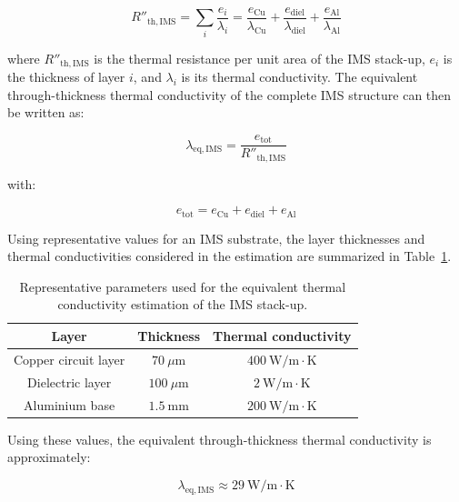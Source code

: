 \begin{equation}
R''_{\mathrm{th,IMS}} =
\sum_i \frac{e_i}{\lambda_i}
=
\frac{e_{\mathrm{Cu}}}{\lambda_{\mathrm{Cu}}}
+
\frac{e_{\mathrm{diel}}}{\lambda_{\mathrm{diel}}}
+
\frac{e_{\mathrm{Al}}}{\lambda_{\mathrm{Al}}}
\end{equation}

where \(R''_{\mathrm{th,IMS}}\) is the thermal resistance per unit area of the IMS stack-up, \(e_i\) is the thickness of layer \(i\), and \(\lambda_i\) is its thermal conductivity. The equivalent through-thickness thermal conductivity of the complete IMS structure can then be written as:

\begin{equation}
\lambda_{\mathrm{eq,IMS}} =
\frac{e_{\mathrm{tot}}}{R''_{\mathrm{th,IMS}}}
\end{equation}

with:

\begin{equation}
e_{\mathrm{tot}} =
e_{\mathrm{Cu}} + e_{\mathrm{diel}} + e_{\mathrm{Al}}
\end{equation}

Using representative values for an IMS substrate, the layer thicknesses and thermal conductivities considered in the estimation are summarized in Table~\ref{tab:ims_stackup_values}.

\begin{table}[H]
    \centering
    \caption{Representative parameters used for the equivalent thermal conductivity estimation of the IMS stack-up.}
    \label{tab:ims_stackup_values}
    \begin{tabular}{|c|c|c|}
        \hline
        \textbf{Layer} & \textbf{Thickness} & \textbf{Thermal conductivity} \\
        \hline
        Copper circuit layer & \(70~\mu\mathrm{m}\) & \(400~\mathrm{W/m\cdot K}\) \\
        \hline
        Dielectric layer & \(100~\mu\mathrm{m}\) & \(2~\mathrm{W/m\cdot K}\) \\
        \hline
        Aluminium base & \(1.5~\mathrm{mm}\) & \(200~\mathrm{W/m\cdot K}\) \\
        \hline
    \end{tabular}
\end{table}

Using these values, the equivalent through-thickness thermal conductivity is approximately:

\begin{equation}
\lambda_{\mathrm{eq,IMS}} \approx 29~\mathrm{W/m\cdot K}
\end{equation}

